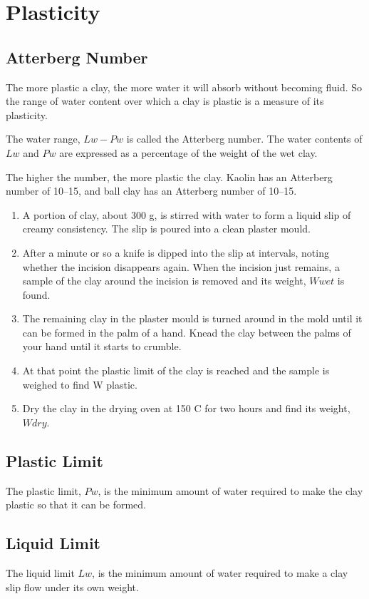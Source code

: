 \section{Plasticity}
\subsection{Atterberg Number}
The more plastic a clay, the more water it will absorb without becoming fluid. 
So the range of water content over which a clay is plastic is a measure of its 
plasticity.

The water range, $Lw - Pw$ is called the Atterberg number. The water contents 
of $Lw$ and $Pw$ are expressed as a percentage of the weight of the wet clay.

The higher the number, the more plastic the clay. Kaolin has an Atterberg 
number of 10--15, and ball clay has an Atterberg number of 10--15.
\begin{enumerate}
\item A portion of clay, about 300 g, is stirred with water to form a liquid 
slip of creamy consistency. The slip is poured into a clean plaster mould. 
\item After a minute or so a knife is dipped into the slip at intervals, noting 
whether the incision disappears again. When the incision just remains, a sample 
of the clay around the incision is removed and its weight, $Wwet$ is found.
\item The remaining clay in the plaster mould is turned around in the mold 
until it can be formed in the palm of a hand. Knead the clay between the palms 
of your hand until it starts to crumble. 
\item At that point the plastic limit of the clay is reached and the sample is 
weighed to find W plastic. 
\item Dry the clay in the drying oven at 150 C for two hours and find its 
weight, $Wdry$.
\end{enumerate}
\subsection{Plastic Limit}
The plastic limit, $Pw$, is the minimum amount of water required to make the 
clay plastic so that it can be formed.
\subsection{Liquid Limit}
The liquid limit $Lw$, is the minimum amount of water required to make a clay 
slip flow under its own weight.
